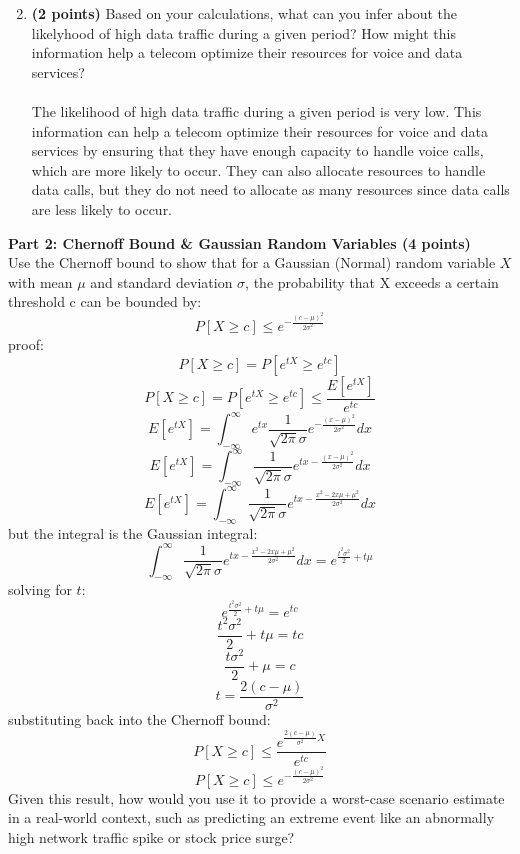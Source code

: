 \documentclass[a3paper,12pt]{extarticle} %
\begin{document}
\begin{enumerate}
\[        \]
        \item \textbf{(2 points)} Based on your calculations, what can you infer about the likelyhood of high data traffic during a given period? How might this information help a telecom optimize their resources for voice and data services?
        \\\\ The likelihood of high data traffic during a given period is very low. This information can help a telecom optimize their resources for voice and data services by ensuring that they have enough capacity to handle voice calls, which are more likely to occur. They can also allocate resources to handle data calls, but they do not need to allocate as many resources since data calls are less likely to occur.
    \end{enumerate}
    \subitem \textbf{Part 2: Chernoff Bound \& Gaussian Random Variables (4 points)}
    \\ Use the Chernoff bound to show that for a Gaussian (Normal) random variable \(X\) with mean \(\mu\) and
    standard deviation \(\sigma\), the probability that X exceeds a certain threshold c can be bounded by:
    \[
    P[X \geq c] \leq e^{-\frac{(c-\mu)^2}{2\sigma^2}}
    \]
    proof:
    \[
    P[X \geq c] = P[e^{tX} \geq e^{tc}]
    \]
    \[
    P[X \geq c] = P[e^{tX} \geq e^{tc}] \leq \frac{E[e^{tX}]}{e^{tc}}
    \]
    \[
    E[e^{tX}] = \int_{-\infty}^{\infty} e^{tx} \frac{1}{\sqrt{2\pi}\sigma} e^{-\frac{(x-\mu)^2}{2\sigma^2}} dx
    \]
    \[
    E[e^{tX}] = \int_{-\infty}^{\infty} \frac{1}{\sqrt{2\pi}\sigma} e^{tx - \frac{(x-\mu)^2}{2\sigma^2}} dx
    \]
    \[
    E[e^{tX}] = \int_{-\infty}^{\infty} \frac{1}{\sqrt{2\pi}\sigma} e^{tx - \frac{x^2 - 2x\mu + \mu^2}{2\sigma^2}} dx
    \]
    but the integral is the Gaussian integral:
    \[
    \int_{-\infty}^{\infty} \frac{1}{\sqrt{2\pi}\sigma} e^{tx - \frac{x^2 - 2x\mu + \mu^2}{2\sigma^2}} dx = e^{\frac{t^2\sigma^2}{2} + t\mu}
    \]
    solving for \(t\):
    \[
    e^{\frac{t^2\sigma^2}{2} + t\mu} = e^{tc}
    \]
    \[
    \frac{t^2\sigma^2}{2} + t\mu = tc
    \]
    \[
    \frac{t\sigma^2}{2} + \mu = c
    \]
    \[
    t = \frac{2(c-\mu)}{\sigma^2}
    \]
    substituting back into the Chernoff bound:
    \[
    P[X \geq c] \leq \frac{e^{\frac{2(c-\mu)}{\sigma^2}X}}{e^{tc}}
    \]
    \[
    P[X \geq c] \leq e^{-\frac{(c-\mu)^2}{2\sigma^2}}
    \]
    Given this result, how would you use it to provide a worst-case scenario estimate in a real-world context, such as predicting an extreme event like an abnormally high network traffic spike or stock price surge?
\end{document}
